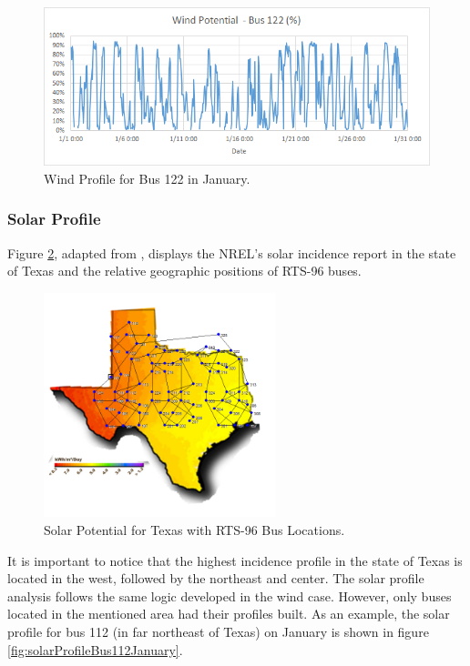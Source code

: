 \documentclass[12pt,LUDisStyle,twosided]{book}
\begin{document}
\begin{figure}[H] 
  \includegraphics[width=\textwidth,keepaspectratio]{windPotentialBus122.png}
  \caption{Wind Profile for Bus 122 in January.}
  \label{fig:windProfileBus122January}
\end{figure}

\newpage
\subsubsection{Solar Profile}

Figure \ref{fig:texasSolarProfile}, adapted from \cite{texasSolarProfile}, displays the NREL's solar incidence report in the state of Texas and the relative geographic positions of RTS-96 buses. 

\begin{figure}[H] 
	\begin{center}
		\includegraphics[width=0.6\textwidth,height=\textheight,keepaspectratio]{texasSolarProfileWithBuses.png}
	  	\caption{Solar Potential for Texas with RTS-96 Bus Locations.}	  		\label{fig:texasSolarProfile}
	\end{center}
\end{figure}


It is important to notice that the highest incidence profile in the state of Texas is located in the west, followed by the northeast and center. The solar profile analysis follows the same logic developed in the wind case. However, only buses located in the mentioned area had their profiles built. As an example, the solar profile for bus 112 (in far northeast of Texas) on January is shown in figure \ref{fig:solarProfileBus112January}.
\end{document}
